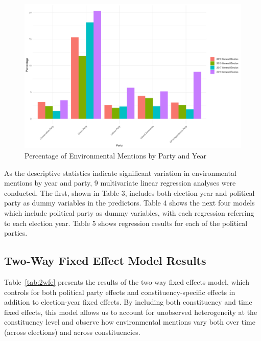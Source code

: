 \documentclass[12pt,letterpaper]{article}
\begin{document}
\vspace{-1cm}
\begin{figure}[H]
	\centering
	\includegraphics[width=\textwidth, height=0.6\textheight, keepaspectratio]{env_mentions_percentage.png} %
	\caption{Percentage of Environmental Mentions by Party and Year}
	\label{fig:env_mentions_perc}
\end{figure}



As the descriptive statistics indicate significant variation in environmental mentions by year and party, 9 multivariate linear regression analyses were conducted. The first, shown in Table 3, includes both election year and political party as dummy variables in the predictors. Table 4 shows the next four models which include political party as dummy variables, with each regression referring to each election year. Table 5 shows regression results for each of the political parties.



\subsection{Two-Way Fixed Effect Model Results}

Table~\ref{tab:2wfe} presents the results of the two-way fixed effects model, which controls for both political party effects and constituency-specific effects in addition to election-year fixed effects. By including both constituency and time fixed effects, this model allows us to account for unobserved heterogeneity at the constituency level and observe how environmental mentions vary both over time (across elections) and across constituencies.
\end{document}
